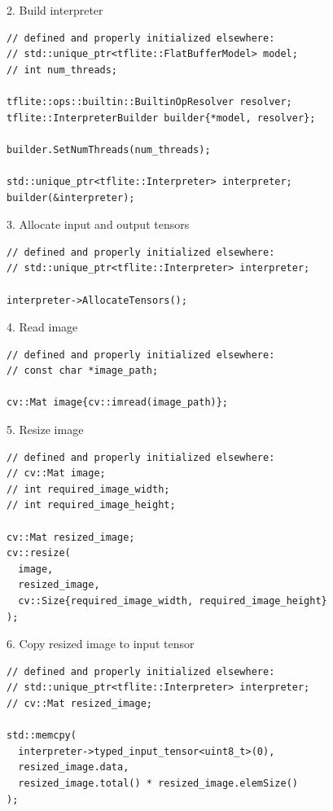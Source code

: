 \begin{frame}[fragile]{2. Build interpreter}
  \lstset{basicstyle=\ttfamily\small, numbers=left, columns=fullflexible}
  \begin{lstlisting}
// defined and properly initialized elsewhere:
// std::unique_ptr<tflite::FlatBufferModel> model;
// int num_threads;

tflite::ops::builtin::BuiltinOpResolver resolver;
tflite::InterpreterBuilder builder{*model, resolver};

builder.SetNumThreads(num_threads);

std::unique_ptr<tflite::Interpreter> interpreter;
builder(&interpreter);
  \end{lstlisting}
\end{frame}

\begin{frame}[fragile]{3. Allocate input and output tensors}
  \lstset{basicstyle=\ttfamily\small, numbers=left, columns=fullflexible}
  \begin{lstlisting}
// defined and properly initialized elsewhere:
// std::unique_ptr<tflite::Interpreter> interpreter;

interpreter->AllocateTensors();
  \end{lstlisting}
\end{frame}

\begin{frame}[fragile]{4. Read image}
  \lstset{basicstyle=\ttfamily\small, numbers=left, columns=fullflexible}
  \begin{lstlisting}
// defined and properly initialized elsewhere:
// const char *image_path;

cv::Mat image{cv::imread(image_path)};
  \end{lstlisting}
\end{frame}

\begin{frame}[fragile]{5. Resize image}
  \lstset{basicstyle=\ttfamily\small, numbers=left, columns=fullflexible}
  \begin{lstlisting}
// defined and properly initialized elsewhere:
// cv::Mat image;
// int required_image_width;
// int required_image_height;

cv::Mat resized_image;
cv::resize(
  image,
  resized_image,
  cv::Size{required_image_width, required_image_height}
);
  \end{lstlisting}
\end{frame}

\begin{frame}[fragile]{6. Copy resized image to input tensor}
  \lstset{basicstyle=\ttfamily\small, numbers=left, columns=fullflexible}
  \begin{lstlisting}
// defined and properly initialized elsewhere:
// std::unique_ptr<tflite::Interpreter> interpreter;
// cv::Mat resized_image;

std::memcpy(
  interpreter->typed_input_tensor<uint8_t>(0),
  resized_image.data,
  resized_image.total() * resized_image.elemSize()
);
  \end{lstlisting}
\end{frame}

